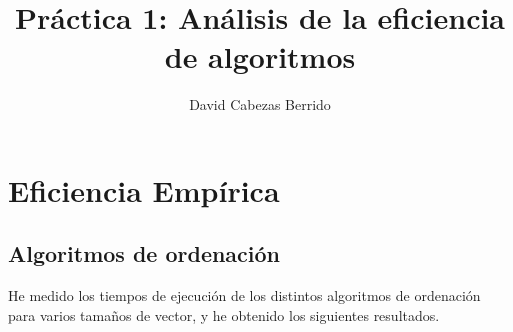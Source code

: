 \documentclass[a4]{article}
\author{David Cabezas Berrido}
\date{\vspace{-5mm}}
\title{\huge Práctica 1: Análisis de la eficiencia de algoritmos \HRule\vspace{-4mm}}
\begin{document}
\maketitle

\tableofcontents

\newpage
\section{Eficiencia Empírica}

\subsection{Algoritmos de ordenación}

\begin{flushleft}
  He medido los tiempos de ejecución de los distintos algoritmos de
  ordenación para varios tamaños de vector, y he obtenido los
  siguientes resultados.
\end{flushleft}
\end{document}

